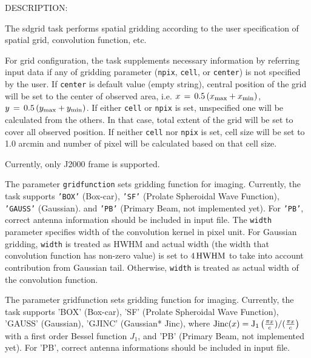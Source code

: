 DESCRIPTION:

The sdgrid task performs spatial gridding according to the user 
specification of spatial grid, convolution function, etc.

For grid configuration, the task supplements necessary information 
by referring input data if any of gridding parameter ({\tt npix}, 
{\tt cell}, or {\tt center}) is not specified by the user. 
If {\tt center} is 
default value (empty string), central position of the grid will be 
set to the center of observed area, i.e. 
$ x \, = \, 0.5 \, (x_{\rm max} + x_{\rm min}) $, 
$ y \, = \, 0.5 \, (y_{\rm max} + y_{\rm min}) $. 
If either {\tt cell} or {\tt npix} is set, unspecified 
one will be calculated from the others. In that case, total extent of 
the grid will be set to cover all observed position. If neither {\tt cell}
nor {\tt npix} is set, cell size will be set to 1.0 arcmin and number of 
pixel will be calculated based on that cell size.
 
Currently, only J2000 frame is supported.
 
The parameter {\tt gridfunction} sets gridding function for imaging. 
Currently, the task supports {\tt 'BOX'} (Box-car), {\tt 'SF'} (Prolate 
Spheroidal Wave Function), {\tt 'GAUSS'} (Gaussian). and {\tt 'PB'} 
(Primary Beam, not implemented yet). For {\tt 'PB'}, correct 
antenna information should be included in input file. 
The {\tt width} parameter specifies width of the convolution kernel 
in pixel unit. For Gaussian gridding, {\tt width} is treated as HWHM 
and actual width (the width that convolution function has non-zero 
value) is set to $ 4 \, {\rm HWHM} $ to take into account contribution from 
Gaussian tail. Otherwise, {\tt width} is treated as actual width of the 
convolution function. 

The parameter gridfunction sets gridding function for imaging. 
Currently, the task supports 'BOX' (Box-car), 'SF' (Prolate 
Spheroidal Wave Function), 'GAUSS' (Gaussian), 'GJINC' (Gaussian*
Jinc), where 
${\rm Jinc}(x) = {\rm J}_1 \left( \frac{\pi x}{c})/(\frac{\pi x}{c} \right)$ 
with a first order 
Bessel function $J_1$, and 'PB' (Primary Beam, not implemented yet). 
For 'PB', correct antenna informations should be included in input 
file. 

